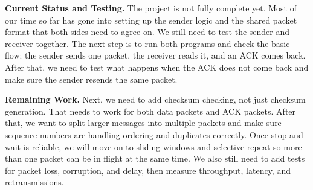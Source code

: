 \documentclass[12pt]{article}
\begin{document}
\vspace{0.5em}
\noindent
\textbf{Current Status and Testing.}
The project is not fully complete yet. Most of our time so far has gone into setting up the sender logic and the shared packet format that both sides need to agree on. We still need to test the sender and receiver together. The next step is to run both programs and check the basic flow: the sender sends one packet, the receiver reads it, and an ACK comes back. After that, we need to test what happens when the ACK does not come back and make sure the sender resends the same packet.

\vspace{0.5em}
\noindent
\textbf{Remaining Work.}
Next, we need to add checksum checking, not just checksum generation. That needs to work for both data packets and ACK packets. After that, we want to split larger messages into multiple packets and make sure sequence numbers are handling ordering and duplicates correctly. Once stop and wait is reliable, we will move on to sliding windows and selective repeat so more than one packet can be in flight at the same time. We also still need to add tests for packet loss, corruption, and delay, then measure throughput, latency, and retransmissions.
\end{document}

